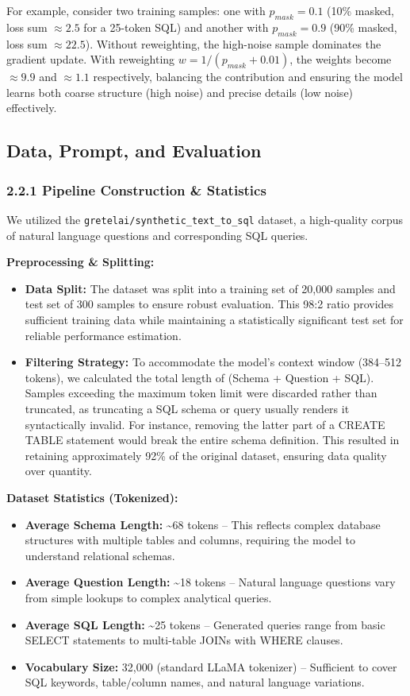 \documentclass[a4paper,12pt]{article}
\begin{document}
For example, consider two training samples: one with $p_{mask} = 0.1$ (10\% masked, loss sum $\approx 2.5$ for a 25-token SQL) and another with $p_{mask} = 0.9$ (90\% masked, loss sum $\approx 22.5$). Without reweighting, the high-noise sample dominates the gradient update. With reweighting $w = 1/(p_{mask} + 0.01)$, the weights become $\approx 9.9$ and $\approx 1.1$ respectively, balancing the contribution and ensuring the model learns both coarse structure (high noise) and precise details (low noise) effectively.

\subsection{Data, Prompt, and Evaluation}

\subsubsection*{2.2.1 Pipeline Construction \& Statistics}
We utilized the \texttt{gretelai/synthetic\_text\_to\_sql} dataset, a high-quality corpus of natural language questions and corresponding SQL queries.

\textbf{Preprocessing \& Splitting:}
\begin{itemize}
\item \textbf{Data Split:} The dataset was split into a training set of 20,000 samples and test set of 300 samples to ensure robust evaluation. This 98:2 ratio provides sufficient training data while maintaining a statistically significant test set for reliable performance estimation.
\item \textbf{Filtering Strategy:} To accommodate the model's context window (384--512 tokens), we calculated the total length of (Schema + Question + SQL). Samples exceeding the maximum token limit were discarded rather than truncated, as truncating a SQL schema or query usually renders it syntactically invalid. For instance, removing the latter part of a CREATE TABLE statement would break the entire schema definition. This resulted in retaining approximately 92\% of the original dataset, ensuring data quality over quantity.
\end{itemize}

\textbf{Dataset Statistics (Tokenized):}
\begin{itemize}
\item \textbf{Average Schema Length:} \textasciitilde68 tokens -- This reflects complex database structures with multiple tables and columns, requiring the model to understand relational schemas.
\item \textbf{Average Question Length:} \textasciitilde18 tokens -- Natural language questions vary from simple lookups to complex analytical queries.
\item \textbf{Average SQL Length:} \textasciitilde25 tokens -- Generated queries range from basic SELECT statements to multi-table JOINs with WHERE clauses.
\item \textbf{Vocabulary Size:} 32,000 (standard LLaMA tokenizer) -- Sufficient to cover SQL keywords, table/column names, and natural language variations.
\end{itemize}
\end{document}
